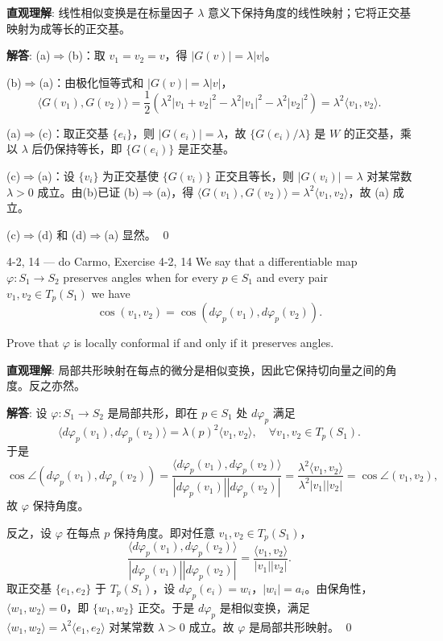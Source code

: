 \begin{solution}
\textbf{直观理解}: 线性相似变换是在标量因子 $\lambda$ 意义下保持角度的线性映射；它将正交基映射为成等长的正交基。

\textbf{解答}: (a)$\Rightarrow$(b)：取 $v_1=v_2=v$，得 $|G(v)| = \lambda|v|$。

(b)$\Rightarrow$(a)：由极化恒等式和 $|G(v)| = \lambda|v|$，
\[
\langle G(v_1),G(v_2)\rangle = \frac{1}{2}\left(\lambda^2|v_1+v_2|^2 - \lambda^2|v_1|^2 - \lambda^2|v_2|^2\right) = \lambda^2\langle v_1,v_2\rangle.
\]

(a)$\Rightarrow$(c)：取正交基 $\{e_i\}$，则 $|G(e_i)| = \lambda$，故 $\{G(e_i)/\lambda\}$ 是 $W$ 的正交基，乘以 $\lambda$ 后仍保持等长，即 $\{G(e_i)\}$ 是正交基。

(c)$\Rightarrow$(a)：设 $\{v_i\}$ 为正交基使 $\{G(v_i)\}$ 正交且等长，则 $|G(v_i)| = \lambda$ 对某常数 $\lambda>0$ 成立。由(b)已证 (b)$\Rightarrow$(a)，得 $\langle G(v_1),G(v_2)\rangle = \lambda^2\langle v_1,v_2\rangle$，故 (a) 成立。

(c)$\Rightarrow$(d) 和 (d)$\Rightarrow$(a) 显然。
\qed
\end{solution}

\begin{exercise}{4-2, 14 — do Carmo, Exercise 4-2, 14}
We say that a differentiable map $\varphi \colon S_1 \to S_2$ preserves angles when for every $p \in S_1$ and every pair $v_1, v_2 \in T_p(S_1)$ we have
\[
\cos \left(v _ {1}, v _ {2}\right) = \cos \left(d \varphi_ {p} \left(v _ {1}\right), d \varphi_ {p} \left(v _ {2}\right)\right).
\]

Prove that $\varphi$ is locally conformal if and only if it preserves angles.
\end{exercise}

\begin{solution}
\textbf{直观理解}: 局部共形映射在每点的微分是相似变换，因此它保持切向量之间的角度。反之亦然。

\textbf{解答}: 设 $\varphi: S_1\to S_2$ 是局部共形，即在 $p\in S_1$ 处 $d\varphi_p$ 满足
\[
\langle d\varphi_p(v_1),d\varphi_p(v_2)\rangle = \lambda(p)^2\langle v_1,v_2\rangle,\quad \forall v_1,v_2\in T_p(S_1).
\]
于是
\[
\cos\angle(d\varphi_p(v_1),d\varphi_p(v_2)) = \frac{\langle d\varphi_p(v_1),d\varphi_p(v_2)\rangle}{|d\varphi_p(v_1)||d\varphi_p(v_2)|} = \frac{\lambda^2\langle v_1,v_2\rangle}{\lambda^2|v_1||v_2|} = \cos\angle(v_1,v_2),
\]
故 $\varphi$ 保持角度。

反之，设 $\varphi$ 在每点 $p$ 保持角度。即对任意 $v_1,v_2\in T_p(S_1)$，
\[
\frac{\langle d\varphi_p(v_1),d\varphi_p(v_2)\rangle}{|d\varphi_p(v_1)||d\varphi_p(v_2)|} = \frac{\langle v_1,v_2\rangle}{|v_1||v_2|}.
\]
取正交基 $\{e_1,e_2\}$ 于 $T_p(S_1)$，设 $d\varphi_p(e_i) = w_i$，$|w_i|=a_i$。由保角性，$\langle w_1,w_2\rangle = 0$，即 $\{w_1,w_2\}$ 正交。于是 $d\varphi_p$ 是相似变换，满足 $\langle w_1,w_2\rangle = \lambda^2\langle e_1,e_2\rangle$ 对某常数 $\lambda>0$ 成立。故 $\varphi$ 是局部共形映射。
\qed
\end{solution}

